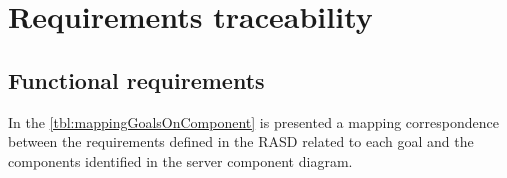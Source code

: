 \setlength{\parindent}{4ex}
\setlength{\parskip}{1ex}

\section{Requirements traceability}

    \subsection{Functional requirements}

        In the \autoref{tbl:mappingGoalsOnComponent} is presented a mapping correspondence between the requirements defined in the RASD
        related to each goal and the components identified in the server component diagram.\\

